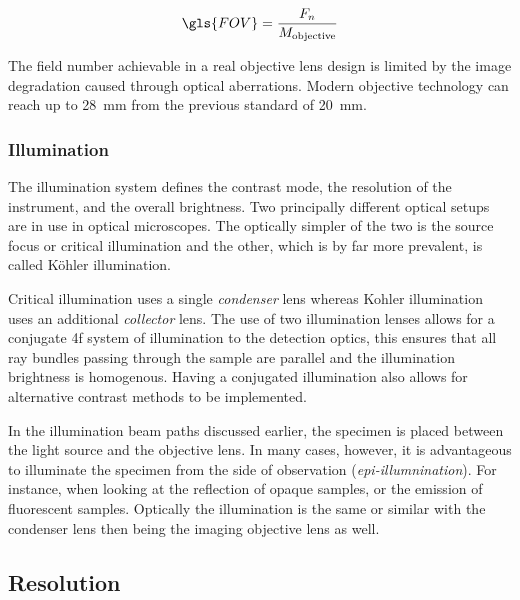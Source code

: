 \begin{align}
    \gls{FOV} = \frac{F_{n}}{M_{\text{objective}}}
\end{align}

The field number achievable in a real \gls{objective lens} design is limited by the image degradation caused through optical aberrations.
Modern objective technology can reach up to \SI{28}{\milli\meter} from the previous standard of \SI{20}{\milli\meter}.

\subsubsection{Illumination}

The illumination system defines the contrast mode, the resolution of the instrument, and the overall brightness.
Two principally different optical setups are in use in optical microscopes.
The optically simpler of the two is the source focus or critical illumination and the other, which is by far more prevalent, is called Köhler illumination.

Critical illumination uses a single \emph{condenser} lens whereas Kohler illumination uses an additional \emph{collector} lens.
The use of two illumination lenses allows for a conjugate \gls{4f}  system of illumination to the detection optics, this ensures that all ray bundles passing through the sample are parallel and the illumination brightness is homogenous.
Having a conjugated illumination also allows for alternative contrast methods to be implemented.

In the illumination beam paths discussed earlier, the specimen is placed between the light source and the \gls{objective lens}.
In many cases, however, it is advantageous to illuminate the specimen from the side of observation (\emph{epi-illumnination}).
For instance, when looking at the reflection of opaque samples, or the emission of fluorescent samples.
Optically the illumination is the same or similar with the condenser lens then being the imaging \gls{objective lens} as well.

\subsection{Resolution}\label{sec:resolution}


